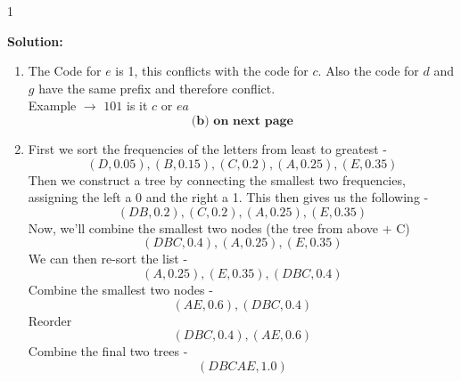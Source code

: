 \documentclass[9pt]{article}
\def\solutions{1}
\begin{document}
\if\solutions1
\vspace{2mm}

\textbf{Solution:} \\

\begin{enumerate}
    \item The Code for $e$ is 1, this conflicts with the code for $c$. Also  the code for $d$ and $g$ have the same prefix and therefore conflict. 
          \\Example $\rightarrow$ $101$ is it $c$ or $ea$
          $$\textbf{(b) on next page}$$
    \newpage
    \item 
    First we sort the frequencies of the letters from least to greatest -
    $$(D,0.05),(B,0.15),(C,0.2),(A,0.25),(E,0.35)$$
    Then we construct a tree by connecting the smallest two frequencies, assigning the left a 0 and the right a 1.
    This then gives us the following -
    $$(DB,0.2),(C,0.2),(A,0.25),(E,0.35)$$
    Now, we'll combine the smallest two nodes (the tree from above + C)
    $$(DBC,0.4),(A,0.25),(E,0.35)$$
    We can then re-sort the list -
    $$(A,0.25),(E,0.35),(DBC,0.4)$$
    Combine the smallest two nodes -
    $$(AE,0.6),(DBC,0.4)$$
    Reorder 
    $$(DBC,0.4),(AE,0.6)$$
    Combine the final two trees -
    $$(DBCAE,1.0)$$


\end{enumerate}
\end{document}
